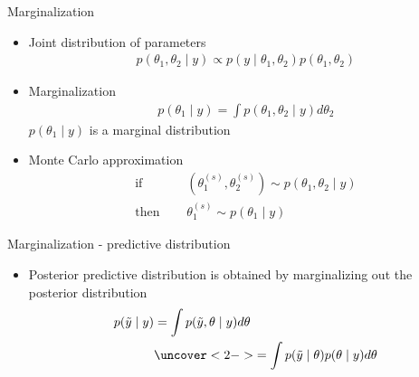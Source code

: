 \documentclass[finnish,english,t]{beamer}
\begin{document}
\begin{frame}{Marginalization}

  \begin{itemize}
  \item<+-> Joint distribution of parameters
    \begin{align*}
      p(\theta_1,\theta_2 \mid y) \propto p(y \mid \theta_1,\theta_2)p(\theta_1,\theta_2)
    \end{align*}
  \item<+-> Marginalization
      \begin{align*}
        p(\theta_1 \mid y) = \int p(\theta_1,\theta_2 \mid y) d\theta_2
      \end{align*}
      $p(\theta_1 \mid y)$ is a marginal distribution
       \vspace{0.5\baselineskip}
    \item<+-> Monte Carlo approximation
      \begin{align*}
        \text{if }\quad & (\theta_1^{(s)},\theta_2^{(s)}) \sim p(\theta_1,\theta_2 \mid y) \\
        \text{then }\quad & \theta_1^{(s)} \sim p(\theta_1 \mid y)
    \end{align*}
  \end{itemize}

\end{frame}

\begin{frame}{Marginalization - predictive distribution}

  \begin{itemize}
  \item Posterior predictive distribution is obtained by marginalizing
    out the posterior distribution
      \begin{align*}
        p(\tilde{y} \mid y)  & = \int p(\tilde{y}, \theta \mid y) d\theta\\
                             & \uncover<2->{= \int p(\tilde{y} \mid \theta)p(\theta \mid y) d\theta}
      \end{align*}
    \end{itemize}

\end{frame}
\end{document}
